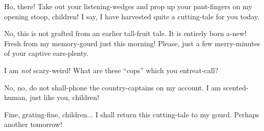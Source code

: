 
Ho, there! Take out your listening-wedges and prop up your pant-fingers
on my opening stoop, children! I say, I have harvested quite a
cutting-tale for you today.

No, this is not grafted from an earlier tall-fruit tale. It is entirely
born a-new! Fresh from my memory-gourd just this morning! Please, just a
few merry-minutes of your captive ears-plenty.

I am \emph{not} scary-weird! What are these ``cops'' which you
entreat-call?

No, no, do not shall-phone the country-captains on my account. I am
scented-human, just like you, children!

Fine, grating-fine, children... I shall return this cutting-tale to my
gourd. Perhaps another tomorrow!
